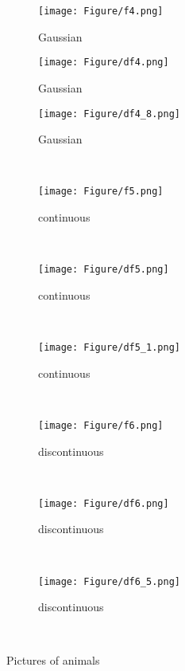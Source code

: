 \begin{figure}
    \begin{subfigure}[b]{0.3\textwidth}
        \texttt{[image: Figure/f4.png]}
        \caption{Gaussian}
        \label{fig:f4}
    \end{subfigure}
    \begin{subfigure}[b]{0.3\textwidth}
        \texttt{[image: Figure/df4.png]}
        \caption{Gaussian}
        \label{fig:df1}
    \end{subfigure}
    \begin{subfigure}[b]{0.3\textwidth}
        \texttt{[image: Figure/df4\_8.png]}
        \caption{Gaussian}
        \label{fig:f4}
    \end{subfigure}\\ %

        \begin{subfigure}[b]{0.3\textwidth}
        \texttt{[image: Figure/f5.png]}
        \caption{continuous}
        \label{fig:f5}
    \end{subfigure}
    ~ %
    \begin{subfigure}[b]{0.3\textwidth}
        \texttt{[image: Figure/df5.png]}
        \caption{continuous}
        \label{fig:df5}
    \end{subfigure}
    ~ %
    \begin{subfigure}[b]{0.3\textwidth}
        \texttt{[image: Figure/df5\_1.png]}
        \caption{continuous}
        \label{fig:df4}
    \end{subfigure}\\ %

            \begin{subfigure}[b]{0.3\textwidth}
        \texttt{[image: Figure/f6.png]}
        \caption{discontinuous}
        \label{fig:f6}
    \end{subfigure}
    ~ %
    \begin{subfigure}[b]{0.3\textwidth}
        \texttt{[image: Figure/df6.png]}
        \caption{discontinuous}
        \label{fig:df6}
    \end{subfigure}
    ~ %
    \begin{subfigure}[b]{0.26\textwidth}
        \texttt{[image: Figure/df6\_5.png]}
        \caption{discontinuous}
        \label{fig:f6}
    \end{subfigure}\\ %

    \caption{Pictures of animals}\label{fig:animals}
\end{figure}

